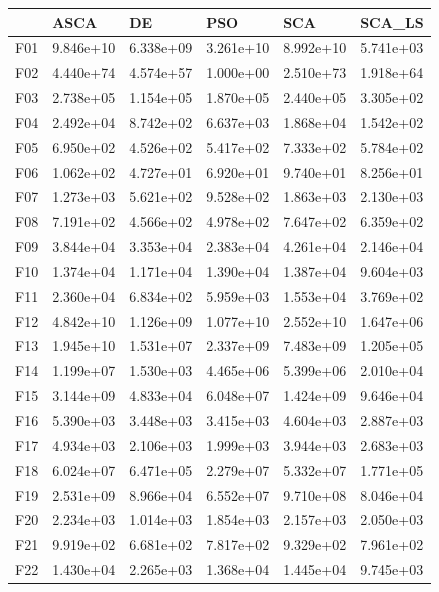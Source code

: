 \begin{tabular}{llllll}
\toprule
{} &       ASCA &         DE &        PSO &        SCA &     SCA\_LS \\
\midrule
F01  &  9.846e+10 &  6.338e+09 &  3.261e+10 &  8.992e+10 &  5.741e+03 \\
F02  &  4.440e+74 &  4.574e+57 &  1.000e+00 &  2.510e+73 &  1.918e+64 \\
F03  &  2.738e+05 &  1.154e+05 &  1.870e+05 &  2.440e+05 &  3.305e+02 \\
F04  &  2.492e+04 &  8.742e+02 &  6.637e+03 &  1.868e+04 &  1.542e+02 \\
F05  &  6.950e+02 &  4.526e+02 &  5.417e+02 &  7.333e+02 &  5.784e+02 \\
F06  &  1.062e+02 &  4.727e+01 &  6.920e+01 &  9.740e+01 &  8.256e+01 \\
F07  &  1.273e+03 &  5.621e+02 &  9.528e+02 &  1.863e+03 &  2.130e+03 \\
F08  &  7.191e+02 &  4.566e+02 &  4.978e+02 &  7.647e+02 &  6.359e+02 \\
F09  &  3.844e+04 &  3.353e+04 &  2.383e+04 &  4.261e+04 &  2.146e+04 \\
F10  &  1.374e+04 &  1.171e+04 &  1.390e+04 &  1.387e+04 &  9.604e+03 \\
F11  &  2.360e+04 &  6.834e+02 &  5.959e+03 &  1.553e+04 &  3.769e+02 \\
F12  &  4.842e+10 &  1.126e+09 &  1.077e+10 &  2.552e+10 &  1.647e+06 \\
F13  &  1.945e+10 &  1.531e+07 &  2.337e+09 &  7.483e+09 &  1.205e+05 \\
F14  &  1.199e+07 &  1.530e+03 &  4.465e+06 &  5.399e+06 &  2.010e+04 \\
F15  &  3.144e+09 &  4.833e+04 &  6.048e+07 &  1.424e+09 &  9.646e+04 \\
F16  &  5.390e+03 &  3.448e+03 &  3.415e+03 &  4.604e+03 &  2.887e+03 \\
F17  &  4.934e+03 &  2.106e+03 &  1.999e+03 &  3.944e+03 &  2.683e+03 \\
F18  &  6.024e+07 &  6.471e+05 &  2.279e+07 &  5.332e+07 &  1.771e+05 \\
F19  &  2.531e+09 &  8.966e+04 &  6.552e+07 &  9.710e+08 &  8.046e+04 \\
F20  &  2.234e+03 &  1.014e+03 &  1.854e+03 &  2.157e+03 &  2.050e+03 \\
F21  &  9.919e+02 &  6.681e+02 &  7.817e+02 &  9.329e+02 &  7.961e+02 \\
F22  &  1.430e+04 &  2.265e+03 &  1.368e+04 &  1.445e+04 &  9.745e+03 \\

\end{tabular}
